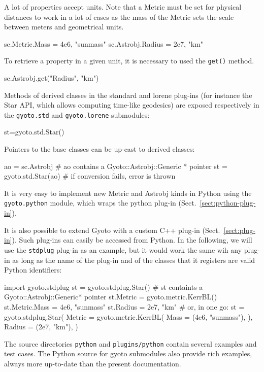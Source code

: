 \documentclass[a4paper,12pt]{article}
\begin{document}
A lot of properties accept units. Note that a Metric must be set for
physical distances to work in a lot of cases as the mass of the Metric
sets the scale between meters and geometrical units.
\begin{code}
  sc.Metric.Mass = 4e6, "sunmass"
  sc.Astrobj.Radius = 2e7, "km"
\end{code}
To retrieve a property in a given unit, it is necessary to used the
\texttt{get()} method.
\begin{code}
  sc.Astrobj.get("Radius", "km")
\end{code}

Methods of derived classes in the standard and lorene plug-ins (for
instance the Star API, which allows computing time-like geodesics) are
exposed respectively in the \texttt{gyoto.std} and
\texttt{gyoto.lorene} submodules:
\begin{code}
  st=gyoto.std.Star()
\end{code}
Pointers to the base classes can be up-cast to derived classes:
\begin{code}
  ao = sc.Astrobj # ao contains a Gyoto::Astrobj::Generic * pointer
  st = gyoto.std.Star(ao) # if conversion fails, error is thrown
\end{code}

It is very easy to implement new Metric and Astrobj kinds in Python
using the \texttt{gyoto.python} module, which wraps the python
plug-in (Sect.~\ref{sect:python-plug-in}).

It is also possible to extend Gyoto with a custom C++ plug-in
(Sect.~\ref{sect:plug-in}). Such plug-ins can easily be accessed from
Python. In the following, we will use the \texttt{stdplug} plug-in as
an example, but it would work the same wih any plug-in as long as the
name of the plug-in and of the classes that it registers are valid
Python identifiers:
\begin{code}
  import gyoto.stdplug
  st = gyoto.stdplug.Star() # st containts a Gyoto::Astrobj::Generic* pointer
  st.Metric = gyoto.metric.KerrBL()
  st.Metric.Mass = 4e6, "sunmass"
  st.Radius = 2e7, "km"
  # or, in one go:
  st = gyoto.stdplug.Star(
      Metric = gyoto.metric.KerrBL(
          Mass = (4e6, "sunmass"),
      ),
      Radius = (2e7, "km"),
  )
\end{code}

The source directories \texttt{python} and \texttt{plugins/python}
contain several examples and test cases. The Python source for gyoto
submodules also provide rich examples, always more up-to-date than the
present documentation.
\end{document}
